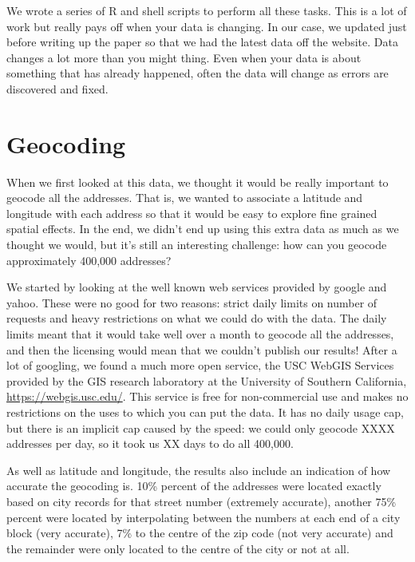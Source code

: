 \documentclass[oneside]{article}
\begin{document}
We wrote a series of R and shell scripts to perform all these tasks.  This is a lot of work but really pays off when your data is changing.  In our case, we updated just before writing up the paper so that we had the latest data off the website.  Data changes a lot more than you might thing.  Even when your data is about something that has already happened, often the data will change  as errors are discovered and fixed.

\section{Geocoding} 

When we first looked at this data, we thought it would be really important to geocode all the addresses.  That is, we wanted to associate a latitude and longitude with each address so that it would be easy to explore fine grained spatial effects.  In the end, we didn't end up using this extra data as much as we thought we would, but it's still an interesting challenge: how can you geocode approximately 400,000 addresses?  

We started by looking at the well known web services provided by google and yahoo.  These were no good for two reasons: strict daily limits on number of requests and heavy restrictions on what we could do with the data.  The daily limits meant that it would take well over a month to geocode all the addresses, and then the licensing would mean that we couldn't publish our results!  After a lot of googling, we found a much more open service, the  USC WebGIS Services provided by the GIS research laboratory at the University of Southern California, \url{https://webgis.usc.edu/}.  This service is free for non-commercial use and makes no restrictions on the uses to which you can put the data.  It has no daily usage cap, but there is an implicit cap caused by the speed: we could only geocode XXXX addresses per day, so it took us XX days to do all 400,000.  

As well as latitude and longitude, the results also include an indication of how accurate the geocoding is.  10\%  percent of the addresses were located exactly based on city records for that street number (extremely accurate), another 75\% percent were located by interpolating between the numbers at each end of a city block (very accurate), 7\% to the centre of the zip code (not very accurate) and the remainder were only located to the centre of the city or not at all.  
\end{document}
